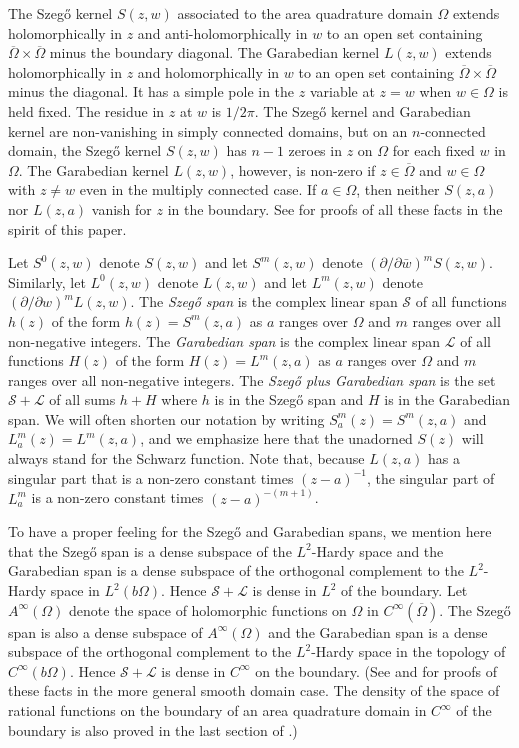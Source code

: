 \documentclass[12pt]{amsart}
\newcommand\dee{\partial}
\newcommand\Om{\Omega}
\newcommand\Obar{\overline{\Omega}}
\numberwithin{equation}{section}
\begin{document}
The Szeg\H o kernel $S(z,w)$ associated to the area
quadrature domain $\Om$ extends holomorphically in
$z$ and anti-holomorphically in $w$ to an open set
containing $\Obar\times\Obar$ minus the boundary
diagonal. The Garabedian kernel $L(z,w)$ 
extends holomorphically in $z$ and holomorphically
in $w$ to an open set containing $\Obar\times\Obar$
minus the diagonal. It has a simple pole in the $z$
variable at $z=w$ when $w\in\Om$ is held fixed. The
residue in $z$ at $w$ is $1/2\pi$. The Szeg\H o kernel
and Garabedian kernel are non-vanishing in simply
connected domains, but on an $n$-connected domain,
the Szeg\H o kernel $S(z,w)$ has $n-1$ zeroes in
$z$ on $\Om$ for each fixed $w$ in $\Om$. The
Garabedian kernel $L(z,w)$, however, is non-zero if
$z\in\Obar$ and $w\in\Om$ with $z\ne w$ even in the
multiply connected case. If
$a\in\Om$, then neither $S(z,a)$ nor $L(z,a)$
vanish for $z$ in the boundary. See \cite{B1} for
proofs of all these facts in the spirit of this paper.

Let $S^0(z,w)$ denote $S(z,w)$ and let $S^m(z,w)$
denote $(\dee/\dee\bar w)^mS(z,w)$. Similarly, 
let $L^0(z,w)$ denote $L(z,w)$ and let $L^m(z,w)$
denote $(\dee/\dee w)^mL(z,w)$.
The {\it Szeg\H o span\/} is the complex linear
span $\mathcal S$ of all functions $h(z)$ of the form
$h(z)=S^m(z,a)$ as $a$ ranges over $\Om$ and $m$
ranges over all non-negative integers.
The {\it Garabedian span\/} is the complex linear
span $\mathcal L$ of all functions $H(z)$ of the form
$H(z)=L^m(z,a)$ as $a$ ranges over $\Om$ and $m$
ranges over all non-negative integers.
The {\it Szeg\H o plus Garabedian span\/} is the set
$\mathcal S +\mathcal L$ of all sums $h+H$ where
$h$ is in the Szeg\H o span and $H$ is in the Garabedian
span. We will often shorten our notation by writing
$S_a^m(z)=S^m(z,a)$ and $L_a^m(z)=L^m(z,a)$, and
we emphasize here that the unadorned $S(z)$ will
always stand for the Schwarz function. Note that,
because $L(z,a)$ has a singular part that is 
a non-zero constant times $(z-a)^{-1}$, the singular
part of $L_a^m$ is a non-zero constant times
$(z-a)^{-(m+1)}$.

To have a proper feeling for the Szeg\H o and Garabedian
spans, we mention here that
the Szeg\H o span is a dense subspace of the $L^2$-Hardy
space and the Garabedian span is a dense subspace of the
orthogonal complement to the $L^2$-Hardy space in $L^2(b\Om)$.
Hence $\mathcal S+\mathcal L$ is dense in $L^2$ of the boundary.
Let $A^\infty(\Om)$ denote the space of holomorphic
functions on $\Om$ in $C^\infty(\Obar)$.
The Szeg\H o span is also a dense subspace of
$A^\infty(\Om)$ 
and the Garabedian span is a dense subspace of the
orthogonal complement to the $L^2$-Hardy space in
the topology of $C^\infty(b\Om)$.
Hence $\mathcal S+\mathcal L$ is dense in $C^\infty$
on the boundary.
(See \cite{B0} and \cite{B1} for proofs of these facts
in the more general smooth domain case. The density of
the space of rational functions on the boundary of an
area quadrature domain in $C^\infty$ of the boundary
is also proved in the last section of \cite{B8}.)
\end{document}
